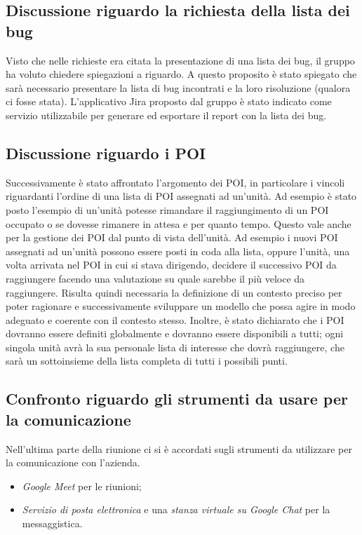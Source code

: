 \subsection{Discussione riguardo la richiesta della lista dei bug}
Visto che nelle richieste era citata la presentazione di una lista dei bug, il gruppo ha voluto chiedere spiegazioni a riguardo. A questo proposito è stato spiegato che sarà necessario presentare la lista di bug incontrati e la loro risoluzione (qualora ci fosse stata). L'applicativo Jira proposto dal gruppo è stato indicato come servizio utilizzabile per generare ed esportare il report con la lista dei bug.

\subsection{Discussione riguardo i POI}
Successivamente è stato affrontato l'argomento dei POI, in particolare i vincoli riguardanti l'ordine di una lista di POI assegnati ad un'unità. Ad esempio è stato posto l'esempio di un'unità potesse rimandare il raggiungimento di un POI occupato o se dovesse rimanere in attesa e per quanto tempo. 
Questo vale anche per la gestione dei POI dal punto di vista dell'unità. Ad esempio i nuovi POI assegnati ad un'unità possono essere posti in coda alla lista, oppure l'unità, una volta arrivata nel POI in cui si stava dirigendo, decidere il successivo POI da raggiungere facendo una valutazione su quale sarebbe il più veloce da raggiungere. 
Risulta quindi necessaria la definizione di un contesto preciso per poter ragionare e successivamente sviluppare un modello che possa agire in modo adeguato e coerente con il contesto stesso.
Inoltre, è stato dichiarato che i POI dovranno essere definiti globalmente e dovranno essere disponibili a tutti; ogni singola unità avrà la sua personale lista di interesse che dovrà raggiungere, che sarà un sottoinsieme della lista completa di tutti i possibili punti.

\subsection{Confronto riguardo gli strumenti da usare per la comunicazione}
Nell'ultima parte della riunione ci si è accordati sugli strumenti da utilizzare per la comunicazione con l'azienda. 
\begin{itemize}
	\item \textit{Google Meet} per le riunioni;
	\item \textit{Servizio di posta elettronica} e una \textit{stanza virtuale su Google Chat} per la messaggistica.
\end{itemize}